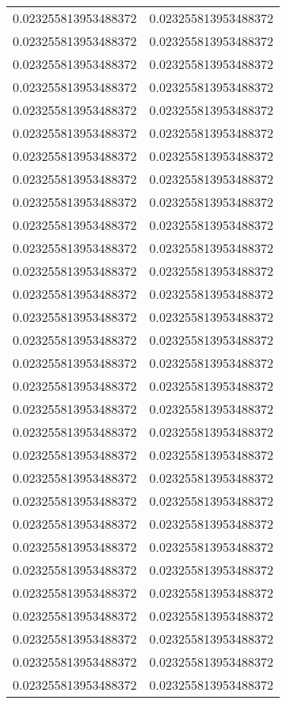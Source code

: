 \documentclass[12pt]{article}
\begin{document}
\begin{tabular}{l l}0.023255813953488372	&	0.023255813953488372\\
0.023255813953488372	&	0.023255813953488372\\
0.023255813953488372	&	0.023255813953488372\\
0.023255813953488372	&	0.023255813953488372\\
0.023255813953488372	&	0.023255813953488372\\
0.023255813953488372	&	0.023255813953488372\\
0.023255813953488372	&	0.023255813953488372\\
0.023255813953488372	&	0.023255813953488372\\
0.023255813953488372	&	0.023255813953488372\\
0.023255813953488372	&	0.023255813953488372\\
0.023255813953488372	&	0.023255813953488372\\
0.023255813953488372	&	0.023255813953488372\\
0.023255813953488372	&	0.023255813953488372\\
0.023255813953488372	&	0.023255813953488372\\
0.023255813953488372	&	0.023255813953488372\\
0.023255813953488372	&	0.023255813953488372\\
0.023255813953488372	&	0.023255813953488372\\
0.023255813953488372	&	0.023255813953488372\\
0.023255813953488372	&	0.023255813953488372\\
0.023255813953488372	&	0.023255813953488372\\
0.023255813953488372	&	0.023255813953488372\\
0.023255813953488372	&	0.023255813953488372\\
0.023255813953488372	&	0.023255813953488372\\
0.023255813953488372	&	0.023255813953488372\\
0.023255813953488372	&	0.023255813953488372\\
0.023255813953488372	&	0.023255813953488372\\
0.023255813953488372	&	0.023255813953488372\\
0.023255813953488372	&	0.023255813953488372\\
0.023255813953488372	&	0.023255813953488372\\
0.023255813953488372	&	0.023255813953488372\\

\end{tabular}
\end{document}
